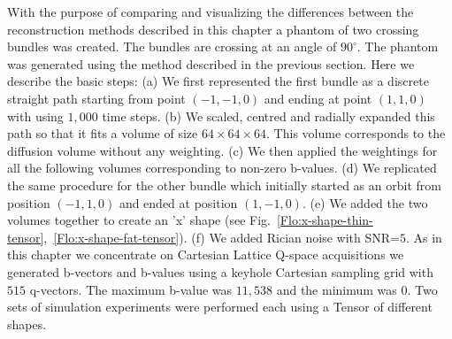 \documentclass{bioinfo}
\begin{document}
With the purpose of comparing and visualizing the differences between
the reconstruction methods described in this chapter a phantom of
two crossing bundles was created. The bundles are crossing at an angle
of $90^{\circ}$. The phantom was generated using the method described
in the previous section. Here we describe the basic steps: (a) We
first represented the first bundle as a discrete straight path starting
from point $(-1,-1,0)$ and ending at point $(1,1,0)$ with using
$1,000$ time steps. (b) We scaled, centred and radially expanded
this path so that it fits a volume of size $64\times64\times64$.
This volume corresponds to the diffusion volume without any weighting.
(c) We then applied the weightings for all the following volumes corresponding
to non-zero b-values. (d) We replicated the same procedure for the
other bundle which initially started as an orbit from position $(-1,1,0)$
and ended at position $(1,-1,0)$. (e) We added the two volumes together
to create an 'x' shape (see Fig.~\ref{Flo:x-shape-thin-tensor},~\ref{Flo:x-shape-fat-tensor}).
(f) We added Rician noise with SNR=$5$. As in this chapter we concentrate
on Cartesian Lattice Q-space acquisitions we generated b-vectors and
b-values using a keyhole Cartesian sampling grid \cite{Tuch2002ThesisMIT}
with $515$ q-vectors. The maximum b-value was $11,538$ and the minimum
was $0$. Two sets of simulation experiments were performed each using
a Tensor of different shapes.
\end{document}
